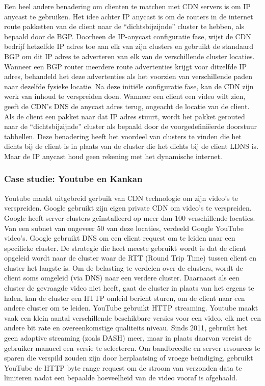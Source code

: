 Een heel andere benadering om clienten te matchen met CDN servers is om IP anycast te gebruiken. Het idee achter IP anycast is om de routers in de internet route pakketten van de client naar de “dichtsbijzijnde” cluster te hebben, als bepaald door de BGP. Doorheen de IP-anycast configuratie fase, wijst de CDN bedrijf hetzelfde IP adres toe aan elk van zijn clusters en gebruikt de standaard BGP om dit IP adres te adverteren van elk van de verschillende cluster locaties. Wanneer een BGP router meerdere route advertenties krijgt voor ditzelfde IP adres, behandeld het deze advertenties als het voorzien van verschillende paden naar dezelfde fysieke locatie. Na deze initiële configuratie fase, kan de CDN zijn werk van inhoud te verspreiden doen. Wanneer een client een video wilt zien, geeft de CDN’s DNS de anycast adres terug, ongeacht de locatie van de client. Als de client een pakket naar dat IP adres stuurt, wordt het pakket gerouted naar de “dichtsbijzijnde” cluster als bepaald door de voorgedefiniëerde doorstuur tabbellen.
Deze benadering heeft het voordeel van clusters te vinden die het dichts bij de client is in plaats van de cluster die het dichts bij de client LDNS is. Maar de IP anycast houd geen rekening met het dynamische internet.

\clearpage

\subsubsection{Case studie: Youtube en Kankan}


Youtube maakt uitgebreid gerbuik van CDN technologie om zijn video’s te verspreiden. Google gebruikt zijn eigen private CDN om video’s te verspreiden. Google heeft server clusters geïnstalleerd op meer dan 100 verschillende locaties. Van een subnet van ongeveer 50 van deze locaties, verdeeld Google YouTube video’s. Google gebruikt DNS om een client request om te leiden naar een specifieke cluster. De strategie die heet meeste gebruikt wordt is dat de client opgeleid wordt naar de cluster waar de RTT (Round Trip Time) tussen client en cluster het laagste is. Om de belasting te verdelen over de clusters, wordt de client soms omgeleid (via DNS) naar een verdere cluster. Daarnaast als een cluster de gevraagde video niet heeft, gaat de cluster in plaats van het ergens te halen, kan de cluster een HTTP omleid bericht sturen, om de client naar een andere cluster om te leiden. YouTube gebruikt HTTP streaming. Youtube maakt vaak een klein aantal verschillende beschikbare versies voor een video, elk met een andere bit rate en overeenkomstige qualiteits niveau. Sinds 2011, gebruikt het geen adaptive streaming (zoals DASH) meer, maar in plaats daarvan vereist de gebruiker manueel een versie te selecteren. Om bandbreedte en server resources te sparen die verspild zouden zijn door herplaatsing of vroege beïndiging, gebruikt YouTube de HTTP byte range request om de stroom van verzonden data te limiteren nadat een bepaalde hoeveelheid van de video vooraf is afgehaald.

